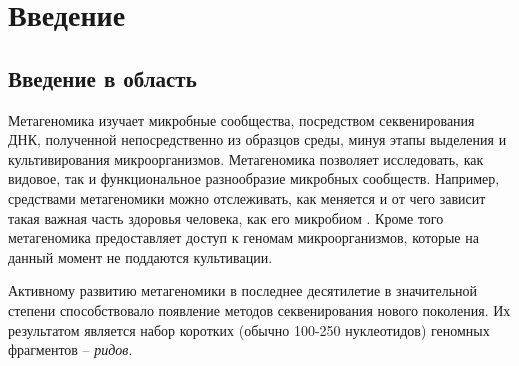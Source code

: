 \documentclass{spbau-diploma}
\begin{document}


\maketitle


\tableofcontents


\section*{Введение}

\subsection{Введение в область} 
Метагеномика  изучает микробные сообщества, посредством секвенирования ДНК, полученной непосредственно из образцов среды, минуя этапы выделения и культивирования микроорганизмов. Метагеномика позволяет исследовать, как видовое, так и функциональное разнообразие микробных сообществ. Например, средствами метагеномики можно отслеживать, как меняется и от чего зависит такая важная часть здоровья человека, как его микробиом \cite{HMP1, HMP2}. Кроме того метагеномика предоставляет доступ к геномам микроорганизмов, которые на данный момент не поддаются культивации.

Активному развитию метагеномики в последнее десятилетие в значительной степени способствовало появление методов секвенирования нового поколения. Их результатом является набор коротких (обычно 100-250 нуклеотидов) геномных фрагментов -- \textit{ридов}. 
\end{document}

